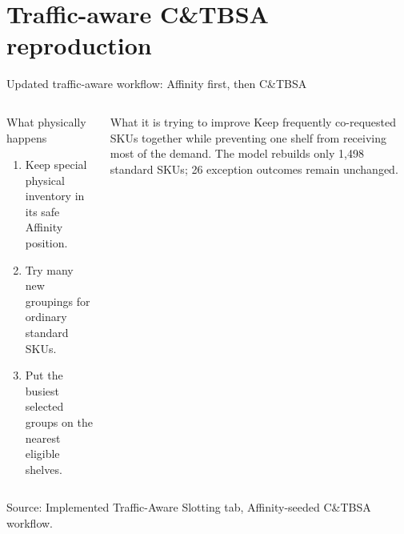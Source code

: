 \documentclass[aspectratio=169,10pt]{beamer}
\newcommand{\source}[1]{\vfill{\tiny\color{gray}Source: #1}}
\begin{document}
\section{Traffic-aware C\&TBSA reproduction}

\begin{frame}{Updated traffic-aware workflow: Affinity first, then C\&TBSA}
  \centering
  \vspace{0.42cm}
  \begin{columns}[T,onlytextwidth]
    \begin{block}{What physically happens}
      \scriptsize
      \begin{enumerate}
        \item Keep special physical inventory in its safe Affinity position.
        \item Try many new groupings for ordinary standard SKUs.
        \item Put the busiest selected groups on the nearest eligible shelves.
      \end{enumerate}
    \end{block}
    \begin{alertblock}{What it is trying to improve}
      \scriptsize Keep frequently co-requested SKUs together while preventing
      one shelf from receiving most of the demand. The model rebuilds only
      1,498 standard SKUs; 26 exception outcomes remain unchanged.
    \end{alertblock}
  \end{columns}
  \source{Implemented Traffic-Aware Slotting tab, Affinity-seeded C\&TBSA workflow.}
\end{frame}
\end{document}
